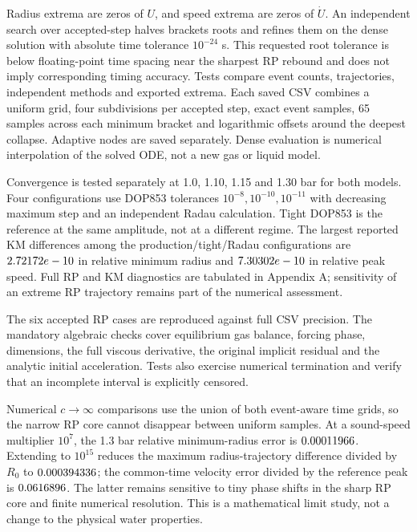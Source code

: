 \documentclass[10pt,a4paper]{article}
\begin{document}
Radius extrema are zeros of $U$, and speed extrema are zeros of $\dot U$. An independent search over accepted-step halves brackets roots and refines them on the dense solution with absolute time tolerance $10^{-24}$ s. This requested root tolerance is below floating-point time spacing near the sharpest RP rebound and does not imply corresponding timing accuracy. Tests compare event counts, trajectories, independent methods and exported extrema. Each saved CSV combines a uniform grid, four subdivisions per accepted step, exact event samples, 65 samples across each minimum bracket and logarithmic offsets around the deepest collapse. Adaptive nodes are saved separately. Dense evaluation is numerical interpolation of the solved ODE, not a new gas or liquid model.

Convergence is tested separately at 1.0, 1.10, 1.15 and 1.30 bar for both models. Four configurations use DOP853 tolerances $10^{-8},10^{-10},10^{-11}$ with decreasing maximum step and an independent Radau calculation. Tight DOP853 is the reference at the same amplitude, not at a different regime. The largest reported KM differences among the production/tight/Radau configurations are $2.72172e-10$ in relative minimum radius and $7.30302e-10$ in relative peak speed. Full RP and KM diagnostics are tabulated in Appendix A; sensitivity of an extreme RP trajectory remains part of the numerical assessment.

The six accepted RP cases are reproduced against full CSV precision. The mandatory algebraic checks cover equilibrium gas balance, forcing phase, dimensions, the full viscous derivative, the original implicit residual and the analytic initial acceleration. Tests also exercise numerical termination and verify that an incomplete interval is explicitly censored.

Numerical $c\to\infty$ comparisons use the union of both event-aware time grids, so the narrow RP core cannot disappear between uniform samples. At a sound-speed multiplier $10^7$, the 1.3 bar relative minimum-radius error is $0.00011966$. Extending to $10^{15}$ reduces the maximum radius-trajectory difference divided by $R_0$ to $0.000394336$; the common-time velocity error divided by the reference peak is $0.0616896$. The latter remains sensitive to tiny phase shifts in the sharp RP core and finite numerical resolution. This is a mathematical limit study, not a change to the physical water properties.

\begin{table}[H]\centering\small
\caption{Five-cycle complete solutions at the six requested amplitudes. Endpoints are included in global extrema; $N_{min}$ excludes the initial state. Very small zero-drive velocities are roundoff.}

\end{table}
\end{document}
